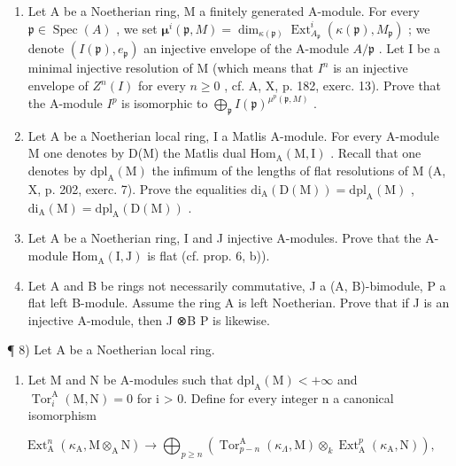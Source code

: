 \begin{enumerate}
\def\labelenumi{\arabic{enumi})}
\setcounter{enumi}{3}
\item
  Let A be a Noetherian ring, M a finitely generated A-module. For every \(\mathfrak{p} \in \operatorname{Spec}(A)\) , we set \(\boldsymbol{\mu}^{i}(\mathfrak{p}, M) = \dim_{\kappa(\mathfrak{p})} \operatorname{Ext}_{A_{\mathfrak{p}}}^{i}(\kappa(\mathfrak{p}), M_{\mathfrak{p}})\) ; we denote \((I(\mathfrak{p}), e_{\mathfrak{p}})\) an injective envelope of the A-module \(A/\mathfrak{p}\) . Let I be a minimal injective resolution of M (which means that \(I^{n}\) is an injective envelope of \(Z^{n}(I)\) for every \(n \geqslant 0\) , cf. A, X, p. 182, exerc. 13). Prove that the A-module \(I^{p}\) is isomorphic to \(\bigoplus_{\mathfrak{p}} I(\mathfrak{p})^{\mu^{p}(\mathfrak{p}, M)}\) .
\item
  Let A be a Noetherian local ring, I a Matlis A-module. For every A-module M one denotes by D(M) the Matlis dual \(\mathrm{Hom}_{\mathrm{A}}(\mathrm{M},\mathrm{I})\) . Recall that one denotes by \(\mathrm{dpl}_{\mathrm{A}}(\mathrm{M})\) the infimum of the lengths of flat resolutions of M (A, X, p. 202, exerc. 7). Prove the equalities \(\mathrm{di}_{\mathrm{A}}(\mathrm{D}(\mathrm{M})) = \mathrm{dpl}_{\mathrm{A}}(\mathrm{M})\) , \(\mathrm{di}_{\mathrm{A}}(\mathrm{M}) = \mathrm{dpl}_{\mathrm{A}}(\mathrm{D}(\mathrm{M}))\) .
\item
  Let A be a Noetherian ring, I and J injective A-modules. Prove that the A-module \(\mathrm{Hom}_{\mathrm{A}}(\mathrm{I},\mathrm{J})\) is flat (cf. prop. 6, b)).
\item
  Let A and B be rings not necessarily commutative, J a (A, B)-bimodule, P a flat left B-module. Assume the ring A is left Noetherian. Prove that if J is an injective A-module, then J ⊗B P is likewise.
\end{enumerate}

¶ 8) Let A be a Noetherian local ring.

\begin{enumerate}
\def\labelenumi{\alph{enumi})}
\tightlist
\item
  Let M and N be A-modules such that \(\mathrm{dpl}_{\mathrm{A}}(\mathrm{M}) < +\infty\) and \(\operatorname{Tor}_{i}^{\mathrm{A}}(\mathrm{M}, \mathrm{N}) = 0\) for i \textgreater{} 0. Define for every integer n a canonical isomorphism
\end{enumerate}

\[
\operatorname{Ext} _ {\mathrm{A}} ^ {n} \left(\kappa_ {\mathrm{A}}, \mathrm{M} \otimes_ {\mathrm{A}} \mathrm{N}\right) \longrightarrow \bigoplus_ {p \geqslant n} \left(\operatorname{Tor} _ {p - n} ^ {\mathrm{A}} \left(\kappa_ {\Lambda}, \mathrm{M}\right) \otimes_ {k} \operatorname{Ext} _ {\mathrm{A}} ^ {p} \left(\kappa_ {\mathrm{A}}, \mathrm{N}\right)\right),
\]

